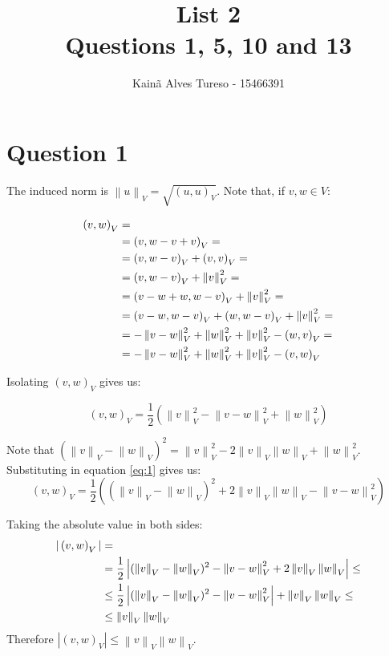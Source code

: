 \documentclass{article}
\author{Kainã Alves Tureso - 15466391}
\title{List 2 \\ Questions 1, 5, 10 and 13}
\newcommand{\norm}[1]{\left\lVert#1\right\rVert_V}
\newcommand{\inner}[2]{\left( #1, #2 \right)_V}
\begin{document}
    \maketitle

    \section*{Question 1}

    The induced norm is $\norm{u} = \sqrt{\inner{u}{u}}$. Note that, if $v,w \in V$:

    \begin{align}
        \inner vw &= \notag \\ 
        &= \inner v{w-v + v} = \notag \\ 
        &= \inner v{w-v} + \inner vv = \notag \\
        &= \inner v{w-v} + \norm{v}^2 =  \notag \\
        &= \inner{v- w + w}{w-v} + \norm{v}^2 = \notag \\
        &= \inner{v-w}{w-v} + \inner w{w-v} + \norm{v}^2 = \notag \\
        &= - \norm{v-w}^2 + \norm{w}^2 + \norm{v}^2 -  \inner wv = \notag \\
        &=- \norm{v-w}^2 + \norm{w}^2 + \norm{v}^2 -  \inner vw \notag
    \end{align}

    Isolating $\inner vw$ gives us:

    \begin{equation}
        \label{eq:1}
        \inner vw = \frac{1}{2} \left( \norm{v}^2 - \norm{v-w}^2 + \norm{w}^2 \right)
    \end{equation}
        
    Note that $(\norm{v} - \norm{w})^2 = \norm{v}^2 - 2\norm{v}\norm{w} + \norm{w}^2$. Substituting in equation \ref{eq:1} gives us:
    \[
        \inner vw = \frac{1}{2} \left( (\norm v - \norm w)^2 + 2 \norm v \norm w - \norm{v-w}^2 \right)
    \]

    Taking the absolute value in both sides:
    \begin{align}
        |\inner vw| &= \notag \\
        &= \frac{1}{2} \left| (\norm v - \norm w)^2 - \norm{v-w}^2 + 2\norm v \norm w \right| \le \notag\\
        & \le  \frac{1}{2}\left| (\norm v - \norm w)^2 - \norm{v-w}^2 \right| + \norm v \norm w \le \notag \\
        & \le \norm v \norm w \notag
    \end{align}
    Therefore $\left| \inner{v}{w} \right| \le \norm v \norm w$.
\end{document}
